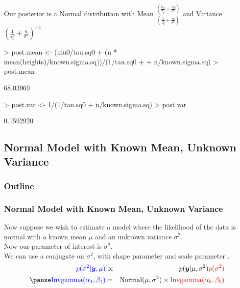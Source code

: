 \documentclass{beamer}
\begin{document}
\begin{frame}[fragile]
Our posterior is a Normal distribution with Mean $\frac{\left( \frac{\mu_0}{\tau_0^2} + \frac{n
\bar{y}}{\sigma^2}\right)}{\left( \frac{1}{\tau_0^2} +
\frac{n}{\sigma^2}\right)}$ and Variance $\left( \frac{1}{\tau_0^2} +
\frac{n}{\sigma^2} \right)^{-1}$
\medskip
\pause
\tiny
\begin{Schunk}
\begin{Sinput}
> post.mean <- (mu0/tau.sq0 + (n * mean(heights)/known.sigma.sq))/(1/tau.sq0 + 
+     n/known.sigma.sq)
> post.mean
\end{Sinput}
\begin{Soutput}
[1] 68.03969
\end{Soutput}
\begin{Sinput}
> post.var <- 1/(1/tau.sq0 + n/known.sigma.sq)
> post.var
\end{Sinput}
\begin{Soutput}
[1] 0.1592920
\end{Soutput}
\end{Schunk}
\normalsize
\end{frame}



\subsection{Normal Model with Known Mean, Unknown Variance}

\begin{frame}
\frametitle{Outline}
\tableofcontents[currentsubsection]
\end{frame}

\begin{frame}
\frametitle{Normal Model with Known Mean, Unknown Variance}
\pause
Now suppose we wish to estimate a model where the likelihood of the data
is normal with a known mean $\mu$ and an unknown variance $\sigma^2$.\\
\bigskip
\pause
Now our parameter of interest is $\sigma^2$. \\
\bigskip
\pause
We can use a conjugate  on $\sigma^2$, with
shape parameter  and scale parameter .
\bigskip
\pause
\begin{eqnarray*}
\blue{p(\sigma^2 | \bm{y}, \mu)} &\propto& p(\bm{y} | \mu, \sigma^2)
\red{p(\sigma^2)} \\
\pause
\blue{\mathrm{Invgamma}(\alpha_1, \beta_1)} &=& \mathrm{Normal}(\mu, \sigma^2)
\times \red{\mathrm{Invgamma}(\alpha_0, \beta_0)}
\end{eqnarray*}
\end{frame}
\end{document}
